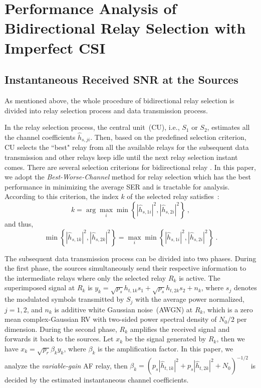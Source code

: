 \documentclass[onecolumn,letterpaper,11pt,draftclsnofoot]{IEEEtran}
\begin{document}
\section{Performance Analysis of Bidirectional Relay Selection with Imperfect CSI}

\subsection{Instantaneous Received SNR at the Sources}

As mentioned above, the whole procedure of bidirectional relay
selection is divided into relay selection process and data
transmission process.

In the relay selection process, the central unit~(CU), i.e., $S_1$
or $S_2$, estimates all the channel coefficients $\hat h_{s,ji}$.
Then, based on the predefined selection criterion, CU selects the
``best" relay from all the available relays for the subsequent data
transmission and other relays keep idle until the next relay
selection instant comes. There are several selection criterions for
bidirectional relay
\cite{Zhang2009,Kyu2009,Song2010,Song2011,Jing2009,Nguyen2010}. In
this paper, we adopt the \emph{Best-Worse-Channel} method for relay
selection which has the best performance in minimizing the average
SER and is tractable for analysis\cite{Jing2009,Nguyen2010}.
According to this criterion, the index $k$ of the selected relay
satisfies~:
\begin{equation}
k = \arg \mathop {\max }\limits_i \min \left\{ \left| {\hat h_{s,1i}
} \right|^2 ,\left| {\hat h_{s,2i} } \right|^2 \right\}~,
\end{equation}
and thus,
\begin{equation}\label{Eq:bestchannel}
 \min \left\{ \left| {\hat h_{s,1k} } \right|^2
,\left| {\hat h_{s,2k} } \right|^2 \right\}  = \mathop {\max
}\limits_i \min \left\{ \left| {\hat h_{s,1i} } \right|^2 ,\left|
{\hat h_{s,2i} } \right|^2 \right\}~.
\end{equation}

The subsequent data transmission process can be divided into two
phases. During the first phase, the sources simultaneously send
their respective information to the intermediate relays where only
the selected relay $R_k$ is active. The superimposed signal at $R_k$
is $ y_k=\sqrt{p_{s}}h_{t,1k}s_1+\sqrt{p_{s}}h_{t,2k}s_2+n_k$, where
$s_j$ denotes the modulated symbols transmitted by $S_j$ with the
average power normalized, $j=1,2$, and $n_k$ is additive white
Gaussian noise~(AWGN) at $R_k$, which is a zero mean
complex-Gaussian RV with two-sided power spectral density of $N_0/2$
per dimension. During the second phase, $R_k$ amplifies the received
signal and forwards it back to the sources. Let $x_k$ be the signal
generated by $R_k$, then we have $x_k = \sqrt {p_r } \beta_k y_k$,
where $\beta_k$ is the amplification factor. In this paper, we
analyze the \emph{variable-gain} AF relay\cite{Seung2009}, then
$\beta_k = \left(p_s \left| {\hat h_{t,1k} } \right|^2 + p_s \left|
{\hat h_{t,2k} } \right|^2 + N_0 \right)^{ -1/2} $ is decided by the
estimated instantaneous channel coefficients.
\end{document}
